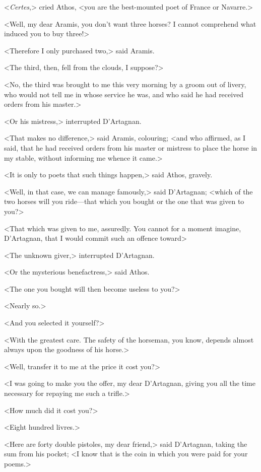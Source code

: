 <\textit{Certes},> cried Athos, <you are the best-mounted poet of France or Navarre.> 

<Well, my dear Aramis, you don't want three horses? I cannot comprehend what induced you to buy three!> 

<Therefore I only purchased two,> said Aramis. 

<The third, then, fell from the clouds, I suppose?> 

<No, the third was brought to me this very morning by a groom out of livery, who would not tell me in whose service he was, and who said he had received orders from his master.> 

<Or his mistress,> interrupted D'Artagnan. 

<That makes no difference,> said Aramis, colouring; <and who affirmed, as I said, that he had received orders from his master or mistress to place the horse in my stable, without informing me whence it came.> 

<It is only to poets that such things happen,> said Athos, gravely. 

<Well, in that case, we can manage famously,> said D'Artagnan; <which of the two horses will you ride—that which you bought or the one that was given to you?> 

<That which was given to me, assuredly. You cannot for a moment imagine, D'Artagnan, that I would commit such an offence toward\longdash> 

<The unknown giver,> interrupted D'Artagnan. 

<Or the mysterious benefactress,> said Athos. 

<The one you bought will then become useless to you?> 

<Nearly so.> 

<And you selected it yourself?> 

<With the greatest care. The safety of the horseman, you know, depends almost always upon the goodness of his horse.> 

<Well, transfer it to me at the price it cost you?> 

<I was going to make you the offer, my dear D'Artagnan, giving you all the time necessary for repaying me such a trifle.> 

<How much did it cost you?> 

<Eight hundred livres.> 

<Here are forty double pistoles, my dear friend,> said D'Artagnan, taking the sum from his pocket; <I know that is the coin in which you were paid for your poems.> 


